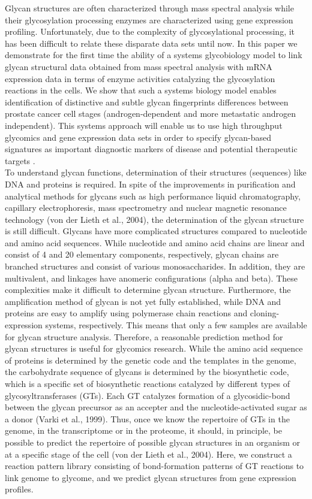 \documentclass[12pt,a4paper]{article}
\begin{document}
Glycan structures are often characterized through mass spectral analysis while their glycosylation processing enzymes are characterized using gene expression profiling. Unfortunately, due to the complexity of glycosylational processing, it has been difficult to relate these disparate data sets until now. In this paper we demonstrate for the first time the ability of a systems glycobiology model to link glycan structural data obtained from mass spectral analysis with mRNA expression data in terms of enzyme activities catalyzing the glycosylation reactions in the cells. We show that such a systems biology model enables identification of distinctive and subtle glycan fingerprints differences between prostate cancer cell stages (androgen-dependent and more metastatic androgen independent). This systems approach will enable us to use high throughput glycomics and gene expression data sets in order to specify glycan-based signatures as important diagnostic markers of disease and potential therapeutic targets \citep{10.1371/journal.pcbi.1002813}.\\

To understand glycan functions, determination of their structures (sequences) like DNA and proteins is required. In spite of the improvements in purification and analytical methods for glycans such as high performance liquid chromatography, capillary electrophoresis, mass spectrometry and nuclear magnetic resonance technology (von der Lieth et al., 2004), the determination of the glycan structure is still difficult. Glycans have more complicated structures compared to nucleotide and amino acid sequences. While nucleotide and amino acid chains are linear and consist of 4 and 20 elementary components, respectively, glycan chains are branched structures and consist of various monosaccharides. In addition, they are multivalent, and linkages have anomeric configurations (alpha and beta). These complexities make it difficult to determine glycan structure. Furthermore, the amplification method of glycan is not yet fully established, while DNA and proteins are easy to amplify using polymerase chain reactions and cloning-expression systems, respectively. This means that only a few samples are available for glycan structure analysis. Therefore, a reasonable prediction method for glycan structures is useful for glycomics research. While the amino acid sequence of proteins is determined by the genetic code and the templates in the genome, the carbohydrate sequence of glycans is determined by the biosynthetic code, which is a specific set of biosynthetic reactions catalyzed by different types of glycosyltransferases (GTs). Each GT catalyzes formation of a glycosidic-bond between the glycan precursor as an accepter and the nucleotide-activated sugar as a donor (Varki et al., 1999). Thus, once we know the repertoire of GTs in the genome, in the transcriptome or in the proteome, it should, in principle, be possible to predict the repertoire of possible glycan structures in an organism or at a specific stage of the cell (von der Lieth et al., 2004). Here, we construct a reaction pattern library consisting of bond-formation patterns of GT reactions to link genome to glycome, and we predict glycan structures from gene expression profiles.
\end{document}
